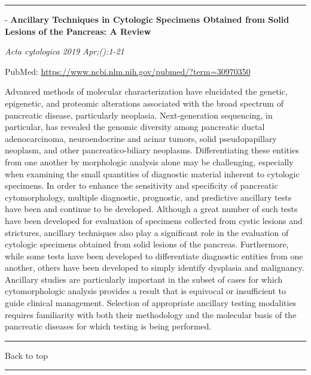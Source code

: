 \documentclass[]{article}
\begin{document}
{}

\begin{center}\rule{0.5\linewidth}{\linethickness}\end{center}

 - \textbf{Ancillary Techniques in Cytologic Specimens Obtained from
Solid Lesions of the Pancreas: A Review}

\emph{Acta cytologica 2019 Apr;():1-21}

PubMed: \url{https://www.ncbi.nlm.nih.gov/pubmed/?term=30970350}

Advanced methods of molecular characterization have elucidated the
genetic, epigenetic, and proteomic alterations associated with the broad
spectrum of pancreatic disease, particularly neoplasia. Next-generation
sequencing, in particular, has revealed the genomic diversity among
pancreatic ductal adenocarcinoma, neuroendocrine and acinar tumors,
solid pseudopapillary neoplasm, and other pancreatico-biliary neoplasms.
Differentiating these entities from one another by morphologic analysis
alone may be challenging, especially when examining the small quantities
of diagnostic material inherent to cytologic specimens. In order to
enhance the sensitivity and specificity of pancreatic cytomorphology,
multiple diagnostic, prognostic, and predictive ancillary tests have
been and continue to be developed. Although a great number of such tests
have been developed for evaluation of specimens collected from cystic
lesions and strictures, ancillary techniques also play a significant
role in the evaluation of cytologic specimens obtained from solid
lesions of the pancreas. Furthermore, while some tests have been
developed to differentiate diagnostic entities from one another, others
have been developed to simply identify dysplasia and malignancy.
Ancillary studies are particularly important in the subset of cases for
which cytomorphologic analysis provides a result that is equivocal or
insufficient to guide clinical management. Selection of appropriate
ancillary testing modalities requires familiarity with both their
methodology and the molecular basis of the pancreatic diseases for which
testing is being performed.

{}

{}

\begin{center}\rule{0.5\linewidth}{\linethickness}\end{center}

Back to top

\begin{center}\rule{0.5\linewidth}{\linethickness}\end{center}
\end{document}
